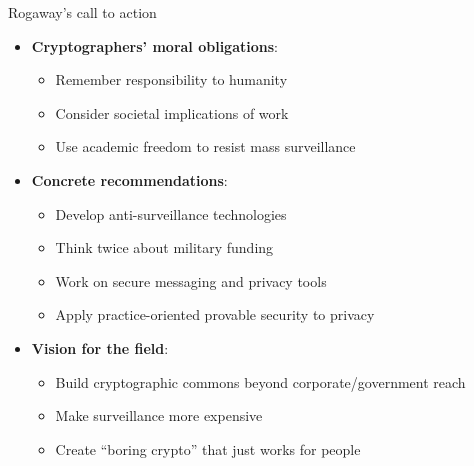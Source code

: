 \ifdefined\PRESENTATION\else\PassOptionsToClass{handout}{beamer}\fi\documentclass[aspectratio=169, lualatex]{beamer}
\begin{document}
\begin{frame}{Rogaway's call to action}
	\begin{itemize}[<+->]
		\item \textbf{Cryptographers' moral obligations}:
		      \begin{itemize}
			      \item Remember responsibility to humanity
			      \item Consider societal implications of work
			      \item Use academic freedom to resist mass surveillance
		      \end{itemize}
		\item \textbf{Concrete recommendations}:
		      \begin{itemize}
			      \item Develop anti-surveillance technologies
			      \item Think twice about military funding
			      \item Work on secure messaging and privacy tools
			      \item Apply practice-oriented provable security to privacy
		      \end{itemize}
		\item \textbf{Vision for the field}:
		      \begin{itemize}
			      \item Build cryptographic commons beyond corporate/government reach
			      \item Make surveillance more expensive
			      \item Create ``boring crypto'' that just works for people
		      \end{itemize}
	\end{itemize}
\end{frame}
\end{document}
